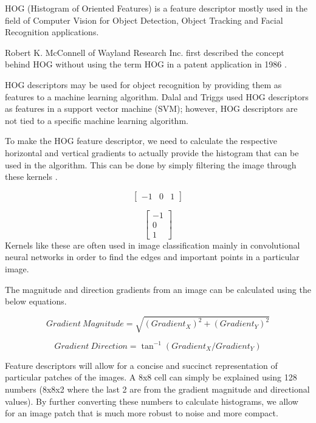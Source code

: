 \documentclass{article}
\begin{document}
HOG (Histogram of Oriented Features) \cite{unknown-author-2022} is a feature descriptor mostly used in the field of Computer Vision for Object Detection, Object Tracking and Facial Recognition applications.

Robert K. McConnell of Wayland Research Inc. first described the concept behind HOG without using the term HOG in a patent application in 1986 \cite{mcconnell1986method}.

HOG descriptors may be used for object recognition by providing them as features to a machine learning algorithm. Dalal and Triggs used HOG descriptors as features in a support vector machine (SVM);\cite{1467360} however, HOG descriptors are not tied to a specific machine learning algorithm.

To make the HOG feature descriptor, we need to calculate the respective horizontal and vertical gradients to actually provide the histogram that can be used in the algorithm. This can be done by simply filtering the image through these kernels \cite{mittal-2021}.

\begin{equation}
    \begin{bmatrix}
    -1 & 0 & 1
    \end{bmatrix}
\end{equation}

\begin{equation}
    \begin{bmatrix}
    -1\\
    0\\
    1
    \end{bmatrix}
\end{equation}
Kernels like these are often used in image classification mainly in convolutional neural networks in order to find the edges and important points in a particular image.

The magnitude and direction gradients from an image can be calculated using the below equations.

\begin{equation}
    Gradient\ Magnitude = \sqrt{(Gradient_X)^2+(Gradient_Y)^2}
\end{equation}

\begin{equation}
    Gradient\ Direction = \tan^{-1}(Gradient_X/Gradient_Y)
\end{equation}

Feature descriptors will allow for a concise and succinct representation of particular patches of the images. A 8x8 cell can simply be explained using 128 numbers (8x8x2 where the last 2 are from the gradient magnitude and directional values). By further converting these numbers to calculate histograms, we allow for an image patch that is much more robust to noise and more compact.
\end{document}
